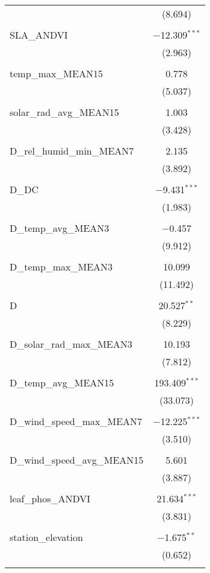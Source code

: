 \begin{table}[!htbp]
\begin{tabular}{@{\extracolsep{5pt}}lc}
  & (8.694) \\ 
  & \\ 
 SLA\_ANDVI & $-$12.309$^{***}$ \\ 
  & (2.963) \\ 
  & \\ 
 temp\_max\_MEAN15 & 0.778 \\ 
  & (5.037) \\ 
  & \\ 
 solar\_rad\_avg\_MEAN15 & 1.003 \\ 
  & (3.428) \\ 
  & \\ 
 D\_rel\_humid\_min\_MEAN7 & 2.135 \\ 
  & (3.892) \\ 
  & \\ 
 D\_DC & $-$9.431$^{***}$ \\ 
  & (1.983) \\ 
  & \\ 
 D\_temp\_avg\_MEAN3 & $-$0.457 \\ 
  & (9.912) \\ 
  & \\ 
 D\_temp\_max\_MEAN3 & 10.099 \\ 
  & (11.492) \\ 
  & \\ 
 D & 20.527$^{**}$ \\ 
  & (8.229) \\ 
  & \\ 
 D\_solar\_rad\_max\_MEAN3 & 10.193 \\ 
  & (7.812) \\ 
  & \\ 
 D\_temp\_avg\_MEAN15 & 193.409$^{***}$ \\ 
  & (33.073) \\ 
  & \\ 
 D\_wind\_speed\_max\_MEAN7 & $-$12.225$^{***}$ \\ 
  & (3.510) \\ 
  & \\ 
 D\_wind\_speed\_avg\_MEAN15 & 5.601 \\ 
  & (3.887) \\ 
  & \\ 
 leaf\_phos\_ANDVI & 21.634$^{***}$ \\ 
  & (3.831) \\ 
  & \\ 
 station\_elevation & $-$1.675$^{**}$ \\ 
  & (0.652) \\ 
  & \\ 

\end{tabular}
\end{table}
